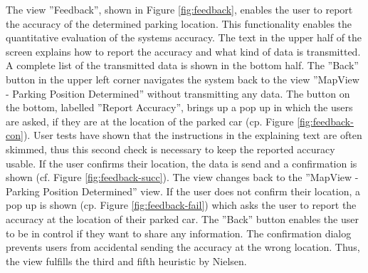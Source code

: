 The view ''Feedback'', shown in Figure \ref{fig:feedback}, enables the user to report the accuracy of the determined parking location. This functionality enables the quantitative evaluation of the systems accuracy. The text in the upper half of the screen explains how to report the accuracy and what kind of data is transmitted. A complete list of the transmitted data is shown in the bottom half. The ''Back'' button in the upper left corner navigates the system back to the view ''MapView - Parking Position Determined'' without transmitting any data. The button on the bottom, labelled ''Report Accuracy'', brings up a pop up in which the users are asked, if they are at the location of the parked car (cp. Figure \ref{fig:feedback-con}). User tests have shown that the instructions in the explaining text are often skimmed, thus this second check is necessary to keep the reported accuracy usable. If the user confirms their location, the data is send and a confirmation is shown (cf. Figure \ref{fig:feedback-succ}). The view changes back to the ''MapView - Parking Position Determined'' view. If the user does not confirm their location, a pop up is shown (cp. Figure \ref{fig:feedback-fail}) which asks the user to report the accuracy at the location of their parked car. The ''Back'' button enables the user to be in control if they want to share any information. The confirmation dialog prevents users from accidental sending the accuracy at the wrong location. Thus, the view fulfills the third and fifth heuristic by Nielsen. \cite{nielsen1994usability}

